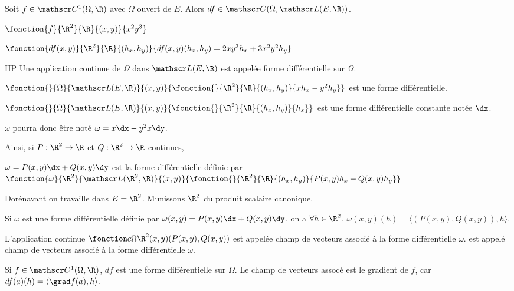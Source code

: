 Soit $f \in \mathscr C^1(\Omega, \R)$ avec $\Omega$ ouvert de $E$. 
Alors $df \in \mathscr C(\Omega, \mathscr L(E, \R))$.

\begin{exemple}
    $\fonction{f}{\R^2}{\R}{(x, y)}{x^2y^3}$

    $\fonction{df(x, y)}{\R^2}{\R}{(h_x, h_y)}{df(x, y)(h_x, h_y) = 2xy^3 h_x + 3x^2y^2 h_y}$
\end{exemple}

\begin{definition}{HP}{}
    Une application continue de $\Omega$ dans $\mathscr L(E, \R)$ est appelée forme différentielle 
    sur $\Omega$. 
\end{definition}

\begin{exemple}
    $\fonction{}{\Omega}{\mathscr L(E, \R)}{(x, y)}{\fonction{}{\R^2}{\R}{(h_x, h_y)}{x h_x - y^2 h_y}}$
    est une forme différentielle. 
\end{exemple}

\begin{exemple}
    $\fonction{}{\Omega}{\mathscr L(E, \R)}{(x, y)}{\fonction{}{\R^2}{\R}{(h_x, h_y)}{h_x}}$
    est une forme différentielle constante notée $\dx$.

    $\omega$ pourra donc être noté $\omega = x \dx - y^2 x \dy$. 

    Ainsi, si $P : \R^2 \to \R$ et $Q : \R^2 \to \R$ continues, 

    $\omega = P(x, y) \dx + Q(x, y) \dy$ est la forme différentielle définie par 
    $\fonction{\omega}{\R^2}{\mathscr L(\R^2, \R)}{(x, y)}{\fonction{}{\R^2}{\R}{(h_x, h_y)}{P(x, y) h_x + Q(x, y) h_y}}$

    Dorénavant on travaille dans $E = \R^2$. Munissons $\R^2$ du produit scalaire canonique. 

    Si $\omega$ est une forme différentielle définie par $\omega(x, y) = P(x, y) \dx + Q(x, y) \dy$,
    on a $\forall h \in \R^2$, $\omega(x, y)(h) = \langle (P(x, y), Q(x, y)), h \rangle$.

    L'application continue $\fonction c \Omega {\R^2}{(x, y)}{(P(x, y), Q(x, y))}$ est appelée champ de vecteurs associé à la forme différentielle $\omega$.
    est appelé champ de vecteurs associé à la forme différentielle $\omega$. 

    Si $f \in \mathscr C^1(\Omega, \R)$, $df$ est une forme différentielle sur $\Omega$. 
    Le champ de vecteurs assocé est le gradient de $f$, car 
    $df(a)(h) = \langle \grad f(a), h \rangle$.

\end{exemple}

